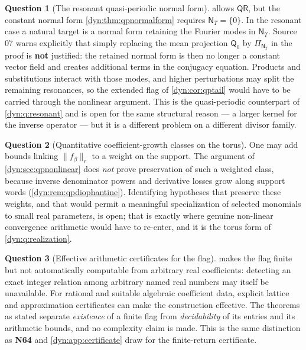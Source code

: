 \documentclass[11pt,letterpaper]{article}
\theoremstyle{definition}
\newtheorem{question}[question]{Question}
\theoremstyle{remark}
\newcommand{\qres}{\mathsf{QR}}
\newcommand{\qlat}{\mathsf N_{\Upsilon}}
\newcommand{\Qz}{\mathsf Q_{0}}
\numberwithin{equation}{section}
\begin{document}
\begin{question}[The resonant quasi-periodic normal form]
\label{dyn:q:qpresonant}
 allows $\qres$, but the constant normal form
\cref{dyn:thm:qpnormalform} requires $\qlat=\{0\}$. In the resonant case a
natural target is a normal form retaining the Fourier modes in $\qlat$.
Source 07 warns explicitly that simply replacing the mean projection $\Qz$
by $\Pi_{\qlat}$ in the proof is \textbf{not} justified: the retained
normal form is then no longer a constant vector field and creates
additional terms in the conjugacy equation. Products and substitutions
interact with those modes, and higher perturbations may split the remaining
resonances, so the extended flag of \cref{dyn:cor:qptail} would have to be
carried through the nonlinear argument. This is the quasi-periodic
counterpart of \cref{dyn:q:resonant} and is open for the same structural
reason --- a larger kernel for the inverse operator --- but it is a
different problem on a different divisor family.
\end{question}

\begin{question}[Quantitative coefficient-growth classes on the torus]
\label{dyn:q:qpgrowth}
One may add bounds linking $\|f_\beta\|_{r}$ to a weight on the support.
The argument of \cref{dyn:sec:qpnonlinear} does \emph{not} prove
preservation of such a weighted class, because inverse denominator powers
and derivative losses grow along support words
(\cref{dyn:rem:qpdiophantine}). Identifying hypotheses that preserve these
weights, and that would permit a meaningful specialization of selected
monomials to small real parameters, is open; that is exactly where genuine
non-linear convergence arithmetic would have to re-enter, and it is the
torus form of \cref{dyn:q:realization}.
\end{question}

\begin{question}[Effective arithmetic certificates for the flag]
\label{dyn:q:qpeffective}
 makes the flag finite but not automatically computable
from arbitrary real coefficients: detecting an exact integer relation among
arbitrary named real numbers may itself be unavailable. For rational and
suitable algebraic coefficient data, explicit lattice and approximation
certificates can make the construction effective. The theorems as stated
separate \emph{existence} of a finite flag from \emph{decidability} of its
entries and its arithmetic bounds, and no complexity claim is made. This is
the same distinction as \textbf{N64} and \cref{dyn:app:certificate} draw
for the finite-return certificate.
\end{question}
\end{document}
